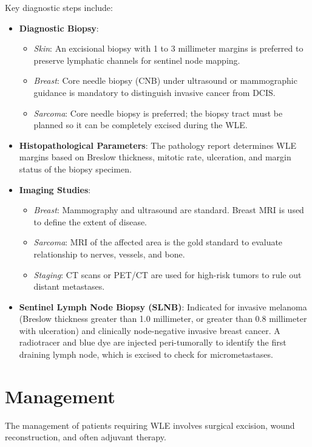 Key diagnostic steps include:
\begin{itemize}
    \item \textbf{Diagnostic Biopsy}:
    \begin{itemize}
        \item \textit{Skin}: An excisional biopsy with 1 to 3 millimeter margins is preferred to preserve lymphatic channels for sentinel node mapping.
        \item \textit{Breast}: Core needle biopsy (CNB) under ultrasound or mammographic guidance is mandatory to distinguish invasive cancer from DCIS.
        \item \textit{Sarcoma}: Core needle biopsy is preferred; the biopsy tract must be planned so it can be completely excised during the WLE.
    \end{itemize}
    \item \textbf{Histopathological Parameters}: The pathology report determines WLE margins based on Breslow thickness, mitotic rate, ulceration, and margin status of the biopsy specimen.
    \item \textbf{Imaging Studies}:
    \begin{itemize}
        \item \textit{Breast}: Mammography and ultrasound are standard. Breast MRI is used to define the extent of disease.
        \item \textit{Sarcoma}: MRI of the affected area is the gold standard to evaluate relationship to nerves, vessels, and bone.
        \item \textit{Staging}: CT scans or PET/CT are used for high-risk tumors to rule out distant metastases.
    \end{itemize}
    \item \textbf{Sentinel Lymph Node Biopsy (SLNB)}: Indicated for invasive melanoma (Breslow thickness greater than 1.0 millimeter, or greater than 0.8 millimeter with ulceration) and clinically node-negative invasive breast cancer. A radiotracer and blue dye are injected peri-tumorally to identify the first draining lymph node, which is excised to check for micrometastases.
\end{itemize}

\section*{Management}
The management of patients requiring WLE involves surgical excision, wound reconstruction, and often adjuvant therapy.

